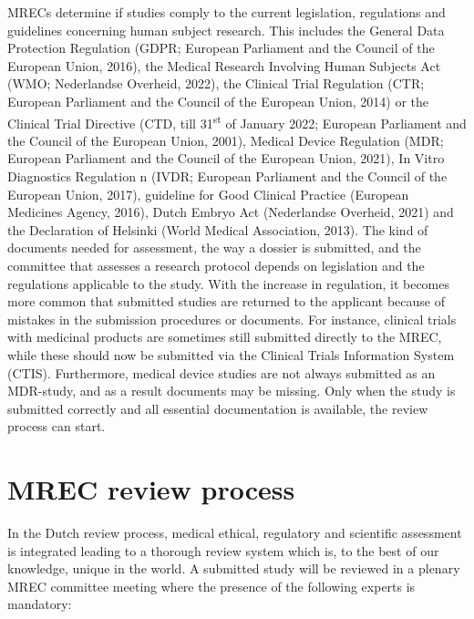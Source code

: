 \documentclass[authordate, meta]{jote-new-article}
\begin{document}
MRECs determine if studies comply to the current legislation, regulations and guidelines concerning human subject research. This includes the General Data Protection Regulation (GDPR; European Parliament and the Council of the European Union, 2016), the Medical Research Involving Human Subjects Act (WMO; Nederlandse Overheid, 2022), the Clinical Trial Regulation (CTR; European Parliament and the Council of the European Union, 2014) or the Clinical Trial Directive (CTD, till 31\textsuperscript{st} of January 2022; European Parliament and the Council of the European Union, 2001), Medical Device Regulation (MDR; European Parliament and the Council of the European Union, 2021), In Vitro Diagnostics Regulation n (IVDR; European Parliament and the Council of the European Union, 2017), guideline for Good Clinical Practice (European Medicines Agency, 2016), Dutch Embryo Act (Nederlandse Overheid, 2021) and the Declaration of Helsinki (World Medical Association, 2013). The kind of documents needed for assessment, the way a dossier is submitted, and the committee that assesses a research protocol depends on legislation and the regulations applicable to the study. With the increase in regulation, it becomes more common that submitted studies are returned to the applicant because of mistakes in the submission procedures or documents. For instance, clinical trials with medicinal products are sometimes still submitted directly to the MREC, while these should now be submitted via the Clinical Trials Information System (CTIS). Furthermore, medical device studies are not always submitted as an MDR-study, and as a result documents may be missing. Only when the study is submitted correctly and all essential documentation is available, the review process can start.







\section{MREC review process}



In the Dutch review process, medical ethical, regulatory and scientific assessment is integrated leading to a thorough review system which is, to the best of our knowledge, unique in the world. A submitted study will be reviewed in a plenary MREC committee meeting where the presence of the following experts is mandatory:
\end{document}
